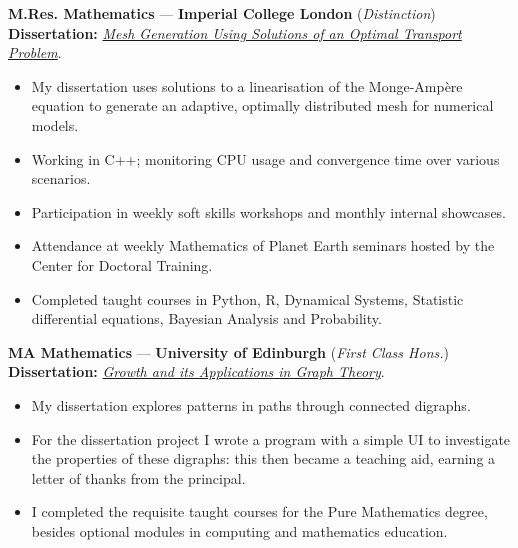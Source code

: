 \documentclass[10pt]{article}
\newenvironment{innerlist}[1][\enskip\textbullet]{
	\begin{itemize}[#1,leftmargin=*,parsep=0pt,itemsep=1pt,topsep=2pt,partopsep=0pt]
}{\end{itemize}}
\begin{document}
\textbf{M.Res. Mathematics} — \textbf{Imperial College London} (\emph{Distinction})\\
\vspace{-2pt}
\hspace{2pt} \textbf{Dissertation:} \href{https://github.com/DrPrettyman/dissertations/blob/main/MresDiss_Prettyman.pdf}{\emph{Mesh Generation Using Solutions of an Optimal Transport Problem}}. 
\vspace{4pt}
\begin{innerlist}
	\item My dissertation uses solutions to a linearisation of the Monge-Ampère equation 
		to generate an adaptive, optimally distributed mesh for numerical models.
	\item Working in C++; monitoring CPU usage and convergence time over various scenarios. 
	\item Participation in weekly soft skills workshops and monthly internal showcases.
	\item Attendance at weekly Mathematics of Planet Earth seminars 
		hosted by the Center for Doctoral Training. 
	\item Completed taught courses in Python, R, Dynamical Systems, 
		Statistic differential equations, Bayesian Analysis and Probability.
\end{innerlist}
\vspace{14pt}

\textbf{MA Mathematics} — \textbf{University of Edinburgh} (\emph{First Class Hons.}) \\
\vspace{-2pt}
\hspace{2pt} \textbf{Dissertation:} \href{https://github.com/DrPrettyman/dissertations/blob/main/MaDiss_Prettyman.pdf}{\emph{Growth and its Applications in Graph Theory}}. 
\vspace{4pt}
\begin{innerlist}
	\item My dissertation explores patterns in paths through connected digraphs. 
	\item For the dissertation project I wrote a program with a simple UI to 
		investigate the properties of these digraphs: this then became a teaching aid, 
		earning a letter of thanks from the principal. 
	\item I completed the requisite taught courses for the Pure Mathematics degree, 
		besides optional modules in computing and mathematics education.
\end{innerlist}
\end{document}
